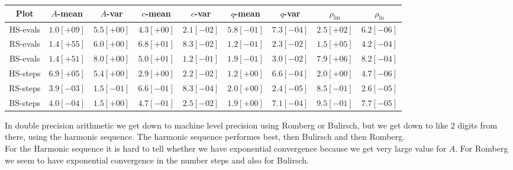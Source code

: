 \begin{table}[H]
    \centering
    \small
    \begin{tabular}{c||c|c|c|c|c|c|c|c}
Plot & \(A\)-mean & \(A\)-var & \(c\)-mean & \(c\)-var & \(q\)-mean & \(q\)-var & \(\rho_{\operatorname{lin}}\) & \(\rho_{\ln}\)\\\hline
\rowcolor{yellow}
HS-evals & \(1.0[+09]\) & \(5.5[+00]\) & \(4.3[+00]\) & \(2.1[-02]\) & \(5.8[-01]\) & \(7.3[-04]\) & \(2.5[+02]\) & \(6.2[-06]\) \\
\rowcolor{red}
RS-evals & \(1.4[+55]\) & \(6.0[+00]\) & \(6.8[+01]\) & \(8.3[-02]\) & \(1.2[-01]\) & \(2.3[-02]\) & \(1.5[+05]\) & \(4.2[-04]\) \\
\rowcolor{red}
BS-evals & \(1.4[+51]\) & \(8.0[+00]\) & \(5.0[+01]\) & \(1.2[-01]\) & \(1.9[-01]\) & \(3.0[-02]\) & \(7.9[+06]\) & \(8.2[-04]\) \\
\rowcolor{yellow}
HS-steps & \(6.9[+05]\) & \(5.4[+00]\) & \(2.9[+00]\) & \(2.2[-02]\) & \(1.2[+00]\) & \(6.6[-04]\) & \(2.0[+00]\) & \(4.7[-06]\) \\
\rowcolor{green}
RS-steps & \(3.9[-03]\) & \(1.5[-01]\) & \(6.6[-01]\) & \(8.3[-04]\) & \(2.0[+00]\) & \(2.4[-05]\) & \(8.5[-01]\) & \(2.6[-05]\) \\
\rowcolor{green}
BS-steps & \(4.0[-04]\) & \(1.5[+00]\) & \(4.7[-01]\) & \(2.5[-02]\) & \(1.9[+00]\) & \(7.1[-04]\) & \(9.5[-01]\) & \(7.7[-05]\) \\
    \end{tabular}
    \label{tab:my_label}
\end{table}

In double precision arithmetic we get down to machine level precision using Romberg or Bulirsch, but we get down to like \(2\) digits from there, using the harmonic sequence. The harmonic sequence performes best, then Bulirsch and then Romberg.\\

For the Harmonic sequence it is hard to tell whether we have exponential convergence because we get very large value for \(A\). For Romberg we seem to have exponential convergence in the number steps and also for Bulirsch.